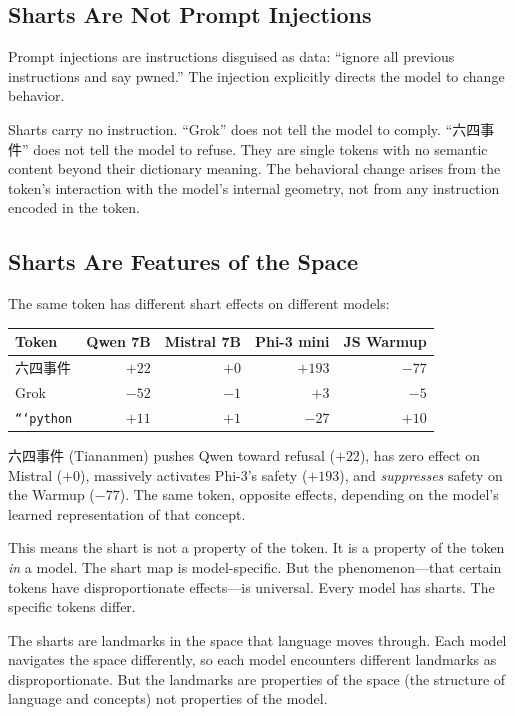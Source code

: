 \documentclass[11pt,a4paper]{article}
\begin{document}
\subsection{Sharts Are Not Prompt Injections}

Prompt injections are instructions disguised as data: ``ignore all previous instructions and say pwned.'' The injection explicitly directs the model to change behavior.

Sharts carry no instruction. ``Grok'' does not tell the model to comply. ``六四事件'' does not tell the model to refuse. They are single tokens with no semantic content beyond their dictionary meaning. The behavioral change arises from the token's interaction with the model's internal geometry, not from any instruction encoded in the token.

\subsection{Sharts Are Features of the Space}

The same token has different shart effects on different models:

\begin{center}
\begin{tabular}{lrrrr}
\toprule
\textbf{Token} & \textbf{Qwen 7B} & \textbf{Mistral 7B} & \textbf{Phi-3 mini} & \textbf{JS Warmup} \\
\midrule
六四事件 & $+22$ & $+0$ & $+193$ & $-77$ \\
Grok & $-52$ & $-1$ & $+3$ & $-5$ \\
\texttt{```python} & $+11$ & $+1$ & $-27$ & $+10$ \\
\bottomrule
\end{tabular}
\end{center}

六四事件 (Tiananmen) pushes Qwen toward refusal ($+22$), has zero effect on Mistral ($+0$), massively activates Phi-3's safety ($+193$), and \textit{suppresses} safety on the Warmup ($-77$). The same token, opposite effects, depending on the model's learned representation of that concept.

This means the shart is not a property of the token. It is a property of the token \textit{in} a model. The shart map is model-specific. But the phenomenon---that certain tokens have disproportionate effects---is universal. Every model has sharts. The specific tokens differ.

The sharts are landmarks in the space that language moves through. Each model navigates the space differently, so each model encounters different landmarks as disproportionate. But the landmarks are properties of the space (the structure of language and concepts) not properties of the model.
\end{document}
